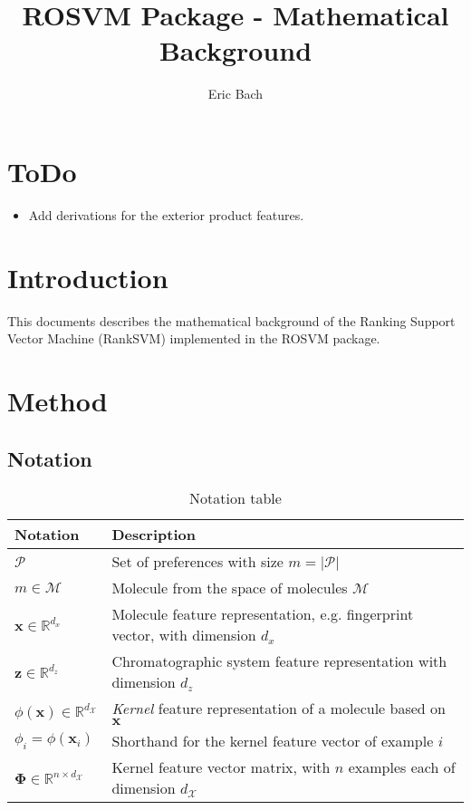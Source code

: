 \documentclass[10p]{article}
\title{ROSVM Package - Mathematical Background}
\author{Eric Bach}
\newcommand{\numexp}{n}
\newcommand{\numpair}{m}
\newcommand{\x}{\mathbf{x}}
\newcommand{\z}{\mathbf{z}}
\newcommand{\Pset}{\mathcal{P}}
\newcommand{\Molspace}{\mathcal{M}}
\newcommand{\bPhi}{\boldsymbol{\Phi}}
\begin{document}
\maketitle

\tableofcontents

\section{ToDo}

\begin{itemize}
    \item Add derivations for the exterior product features.
\end{itemize}

\section{Introduction}

This documents describes the mathematical background of the Ranking Support Vector Machine (RankSVM) \parencite{Joachims2002} implemented in the ROSVM package. 

\section{Method}

\subsection{Notation}
\begin{table}[t]
    \centering
    \caption{Notation table}
    \vspace{2pt}
    \label{tab:notations}
    \begin{tabular}{ll}
        \toprule 
        {\bf Notation} & {\bf Description} \\ \midrule
        $\Pset$ & Set of preferences with size $\numpair=|\Pset|$ \\
        $m\in\Molspace$ & Molecule from the space of molecules $\Molspace$\\
        $\x\in\mathbb{R}^{d_x}$ & Molecule feature representation, e.g. fingerprint vector, with dimension $d_x$ \\
        $\z\in\mathbb{R}^{d_z}$ & Chromatographic system feature representation with dimension $d_z$ \\
        $\phi(\x)\in\mathbb{R}^{d_\mathcal{X}}$ & \emph{Kernel} feature representation of a molecule based on $\x$\\
        $\phi_i=\phi(\x_i)$ & Shorthand for the kernel feature vector of example $i$\\
        $\bPhi\in\mathbb{R}^{\numexp\times d_\mathcal{X}}$ & Kernel feature vector matrix, with $\numexp$ examples each of dimension $d_\mathcal{X}$\\
        \bottomrule
    \end{tabular}
\end{table}
\end{document}
